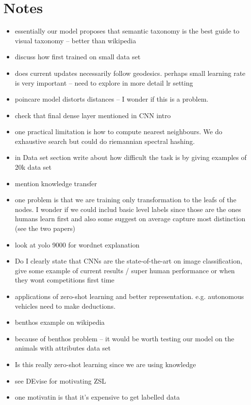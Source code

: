 \documentclass[12pt]{report}
\begin{document}
\chapter{Notes}
\begin{itemize}
  \item essentially our model proposes that semantic taxonomy is the best guide to visual taxonomy -- better than wikipedia 
    \item discuss how first trained on small data set
    \item does current updates necessarily follow geodesics. perhaps small learning rate is very important -- need to explore in more detail lr setting
    \item poincare model distorts distances \cite{Greenberg1994} -- I wonder if this is a problem.
    \item check that final dense layer mentioned in CNN intro
    \item one practical limitation is how to compute nearest neighbours. We do exhaustive search but could do riemannian spectral hashing.
    \item in Data set section write about how difficult the task is by giving examples of 20k data set
    \item mention knowledge transfer
    \item one problem is that we are training only transformation to the leafs of the nodes. I wonder if we could includ basic level labels since those are the ones humans learn first and also some suggest on average capture most distinction (see the two papers)
    \item look at yolo 9000 for wordnet explanation
    \item Do I clearly state that CNNs are the state-of-the-art on image classification, give some example of current results / super human performance or when they wont competitions first time
    \item applications of zero-shot learning and better representation. e.g. autonomous vehicles need to make deductions. 
    \item benthos example on wikipedia
    \item because of benthos problem -- it would be worth testing our model on the animals with attributes data set 
    \item Is this really zero-shot learning since we are using knowledge
    \item see DEvise for motivating ZSL
    \item one motivatin is that it's expensive to get labelled data

\end{itemize}
\end{document}
